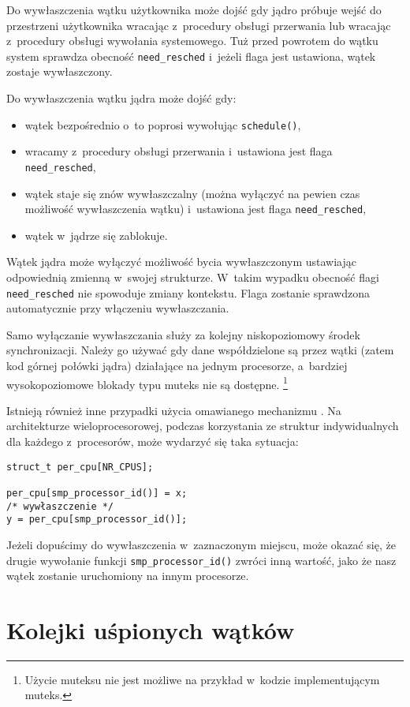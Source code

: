 \documentclass[shortabstract]{iithesis}
\theoremstyle{definition} \newtheorem*{definition}{Definicja}
\theoremstyle{definition} \newtheorem*{example}{Przykład}
\theoremstyle{definition} \newtheorem*{remark}{Uwaga}
\begin{document}
Do wywłaszczenia wątku użytkownika może dojść gdy jądro próbuje wejść do przestrzeni użytkownika wracając
z~procedury obsługi przerwania lub wracając z~procedury obsługi wywołania systemowego. Tuż przed powrotem do wątku
system sprawdza obecność \texttt{need\_resched} i~jeżeli flaga jest ustawiona, wątek zostaje wywłaszczony.

Do wywłaszczenia wątku jądra może dojść gdy:
\begin{itemize}
\item wątek bezpośrednio o~to poprosi wywołując \texttt{schedule()},
\item wracamy z~procedury obsługi przerwania i~ustawiona jest flaga \texttt{need\_resched},
\item wątek staje się znów wywłaszczalny (można wyłączyć na pewien czas możliwość wywłaszczenia wątku)
i~ustawiona jest flaga \texttt{need\_resched},
\item wątek w~jądrze się zablokuje.
\end{itemize}

Wątek jądra może wyłączyć możliwość bycia wywłaszczonym ustawiając odpowiednią zmienną w~swojej strukturze.
W~takim wypadku obecność flagi \texttt{need\_resched} nie spowoduje zmiany kontekstu.
Flaga zostanie sprawdzona automatycznie przy włączeniu wywłaszczania.

Samo wyłączanie wywłaszczania służy za kolejny niskopoziomowy środek synchronizacji.
Należy go używać gdy dane współdzielone są przez wątki (zatem kod górnej połówki jądra) działające na
jednym procesorze, a~bardziej wysokopoziomowe blokady typu muteks nie są dostępne.
\footnote{Użycie muteksu nie jest możliwe na przykład w~kodzie implementującym muteks.}

Istnieją również inne przypadki użycia omawianego mechanizmu \cite{linux:preempt_locking}.
Na architekturze wieloprocesorowej, podczas korzystania ze struktur indywidualnych dla każdego
z~procesorów, może wydarzyć się taka sytuacja:
\begin{lstlisting}
struct_t per_cpu[NR_CPUS];

per_cpu[smp_processor_id()] = x;
/* wywłaszczenie */
y = per_cpu[smp_processor_id()];
\end{lstlisting}

Jeżeli dopuścimy do wywłaszczenia w~zaznaczonym miejscu, może okazać się, że drugie wywołanie funkcji
\texttt{smp\_processor\_id()} zwróci inną wartość, jako że nasz wątek zostanie uruchomiony na innym procesorze.

\section{Kolejki uśpionych wątków}
\end{document}

